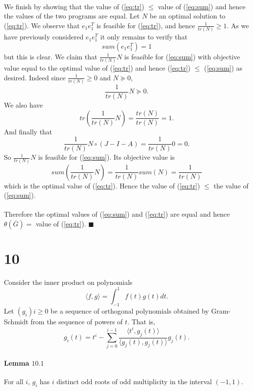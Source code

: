 \documentclass[letterpaper,12pt,oneside,onecolumn]{article}
\newcommand{\1}{\mathbbm{1}}
\begin{document}
\paragraph{}
We finish by showing that the value of (\ref{eq:tr}) $\leq$ value of (\ref{eq:sum}) and hence the values of the two programs are equal. Let $N$ be an optimal solution to (\ref{eq:tr}). We observe that $e_1e_1^T$ is feasible for (\ref{eq:tr}), and hence $\frac{1}{tr(N)} \geq 1$. As we have previously considered $e_1e_1^T$ it only remains to verify that
$$sum(e_1e_1^T) = 1$$
but this is clear. We claim that $\frac{1}{tr(N)} N$ is feasible for (\ref{eq:sum}) with objective value equal to the optimal value of (\ref{eq:tr}) and hence (\ref{eq:tr}) $\leq$ (\ref{eq:sum}) as desired. Indeed since $\frac{1}{tr(N)} \geq 0$ and $N\succcurlyeq 0$,
$$\frac{1}{tr(N)} N \succcurlyeq 0.$$
We also have $$tr(\frac{1}{tr(N)}N) = \frac{tr(N)}{tr(N)} = 1.$$
And finally that
$$\frac{1}{tr(N)} N \circ(J - I - A) = \frac{1}{tr(N)} 0 = 0.$$
So $\frac{1}{tr(N)}N$ is feasible for (\ref{eq:sum}). Its objective value is
$$sum(\frac{1}{tr(N)}N) = \frac{1}{tr(N)} sum(N) = \frac{1}{tr(N)}$$
which is the optimal value of (\ref{eq:tr}). Hence the value of (\ref{eq:tr}) $\leq$ the value of (\ref{eq:sum}).
\paragraph{}
Therefore the optimal values of (\ref{eq:sum}) and (\ref{eq:tr}) are equal and hence $\theta(\overline{G}) =$ value of (\ref{eq:tr}). $\blacksquare$
\section*{10}
\paragraph{}
Consider the inner product on polynomials
$$\langle f, g\rangle = \int_{-1}^1 f(t) g(t) dt.$$
Let $(g_i)i\geq 0$ be a sequence of orthogonal polynomials obtained by Gram-Schmidt from the sequence of powers of $t$. That is,
$$g_i(t) = t^i - \sum_{j=0}^{i-1} \frac{\langle t^i, g_j(t)\rangle}{\langle g_j(t), g_j(t)\rangle} g_j(t).$$
\paragraph{Lemma $10.1$}
For all $i$, $g_i$ has $i$ distinct odd roots of odd multiplicity in the interval $(-1,1)$.
\end{document}
